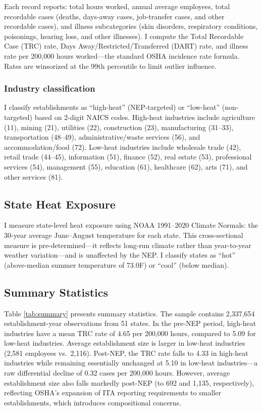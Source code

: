 \documentclass[12pt]{article}
\begin{document}
Each record reports: total hours worked, annual average employees, total recordable cases (deaths, days-away cases, job-transfer cases, and other recordable cases), and illness subcategories (skin disorders, respiratory conditions, poisonings, hearing loss, and other illnesses). I compute the Total Recordable Case (TRC) rate, Days Away/Restricted/Transferred (DART) rate, and illness rate per 200,000 hours worked---the standard OSHA incidence rate formula. Rates are winsorized at the 99th percentile to limit outlier influence.

\subsubsection*{Industry classification} I classify establishments as ``high-heat'' (NEP-targeted) or ``low-heat'' (non-targeted) based on 2-digit NAICS codes. High-heat industries include agriculture (11), mining (21), utilities (22), construction (23), manufacturing (31--33), transportation (48--49), administrative/waste services (56), and accommodation/food (72). Low-heat industries include wholesale trade (42), retail trade (44--45), information (51), finance (52), real estate (53), professional services (54), management (55), education (61), healthcare (62), arts (71), and other services (81).

\subsection{State Heat Exposure}

I measure state-level heat exposure using NOAA 1991--2020 Climate Normals: the 30-year average June--August temperature for each state. This cross-sectional measure is pre-determined---it reflects long-run climate rather than year-to-year weather variation---and is unaffected by the NEP. I classify states as ``hot'' (above-median summer temperature of 73.0\textdegree F) or ``cool'' (below median).

\subsection{Summary Statistics}



Table \ref{tab:summary} presents summary statistics. The sample contains 2,337,654 establishment-year observations from 51 states. In the pre-NEP period, high-heat industries have a mean TRC rate of 4.65 per 200,000 hours, compared to 5.09 for low-heat industries. Average establishment size is larger in low-heat industries (2,581 employees vs.\ 2,116). Post-NEP, the TRC rate falls to 4.33 in high-heat industries while remaining essentially unchanged at 5.10 in low-heat industries---a raw differential decline of 0.32 cases per 200,000 hours. However, average establishment size also falls markedly post-NEP (to 692 and 1,135, respectively), reflecting OSHA's expansion of ITA reporting requirements to smaller establishments, which introduces compositional concerns.
\end{document}
